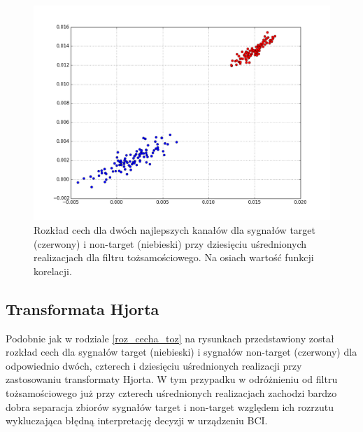 \documentclass[licencjacka,openright]{pracamgr}
\begin{document}
\begin{figure}
\centering
\includegraphics[scale=0.55, trim=10mm 15mm 10mm 18mm, clip=True]{pics/cecha_toz_10.png}
\caption{Rozkład cech dla dwóch najlepszych kanałów dla sygnałów target (czerwony) i non-target (niebieski) przy dziesięciu uśrednionych realizacjach dla filtru tożsamościowego. Na osiach wartość funkcji korelacji.}
\label{cecha_toz_10}
\end{figure}

\subsection{Transformata Hjorta}
\label{roz_cecha_hjorth}
Podobnie jak w rodziale \ref{roz_cecha_toz} na rysunkach przedstawiony został rozkład cech dla sygnałów target (niebieski) i sygnałów non-target (czerwony) dla odpowiednio dwóch, czterech i dziesięciu uśrednionych realizacji przy zastosowaniu transformaty Hjorta. W tym przypadku w odróżnieniu od filtru tożsamościowego już przy czterech uśrednionych realizacjach zachodzi bardzo dobra separacja zbiorów sygnałów target i non-target względem ich rozrzutu wykluczająca błędną interpretację decyzji w urządzeniu BCI.
\end{document}
